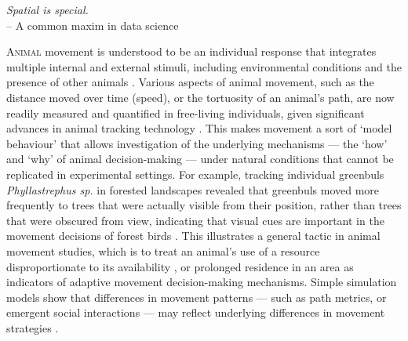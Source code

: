 

\begin{center}
    \emph{Spatial is special.}\\
    \medskip
    -- \small{A common maxim in data science}
\end{center}

\lettrine{A}{nimal} movement is understood to be an individual response that integrates multiple internal and external stimuli, including environmental conditions and the presence of other animals \citep{nathan2008a}.
Various aspects of animal movement, such as the distance moved over time (speed), or the tortuosity of an animal's path, are now readily measured and quantified in free-living individuals, given significant advances in animal tracking technology \citep[][see Nathan et al. \textit{in prep.}]{cagnacci2010}.
This makes movement a sort of `model behaviour' that allows investigation of the underlying mechanisms --- the `how' and `why' of animal decision-making --- under natural conditions that cannot be replicated in experimental settings.
For example, tracking individual greenbuls \textit{Phyllastrephus sp.} in forested landscapes revealed that greenbuls moved more frequently to trees that were actually visible from their position, rather than trees that were obscured from view, indicating that visual cues are important in the movement decisions of forest birds \citep[][see also \citep{aben2018}]{aben2021}.
This illustrates a general tactic in animal movement studies, which is to treat an animal's use of a resource disproportionate to its availability \citep{manly2007,fortin2005,signer2019}, or prolonged residence in an area \citep{bracis2018} as indicators of adaptive movement decision-making mechanisms.
Simple simulation models show that differences in movement patterns --- such as path metrics, or emergent social interactions --- may reflect underlying differences in movement strategies \citep{spiegel2017,stuber2022,spiegel2022}.

